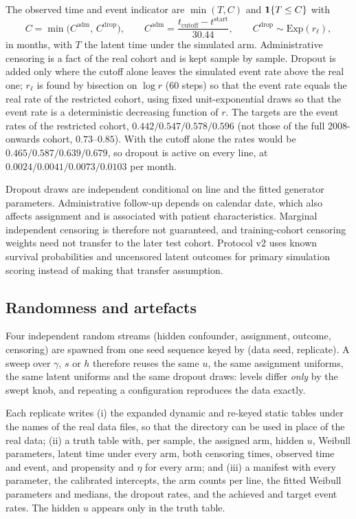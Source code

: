 The observed time and event indicator are $\min(T,C)$ and $\mathbf{1}\{T\le C\}$ with
\begin{equation}
    C=\min\big(C^{\text{adm}},\,C^{\text{drop}}\big),\qquad
    C^{\text{adm}}=\frac{t_{\text{cutoff}}-t^{\text{start}}}{30.44},\qquad
    C^{\text{drop}}\sim\text{Exp}(r_\ell),
\end{equation}
in months, with $T$ the latent time under the simulated arm. Administrative censoring is a
fact of the real cohort and is kept sample by sample. Dropout is added only where the cutoff
alone leaves the simulated event rate above the real one; $r_\ell$ is found by bisection on
$\log r$ (60 steps) so that the event rate equals the real rate of the restricted cohort,
using fixed unit-exponential draws so that the event rate is a deterministic decreasing
function of $r$. The targets are the event rates of the restricted cohort,
$0.442/0.547/0.578/0.596$ (not those of the full 2008-onwards cohort, $0.73$--$0.85$). With
the cutoff alone the rates would be $0.465/0.587/0.639/0.679$, so dropout is active on every
line, at $0.0024/0.0041/0.0073/0.0103$ per month.

Dropout draws are independent conditional on line and the fitted generator parameters.
Administrative follow-up depends on calendar date, which also affects assignment and is
associated with patient characteristics. Marginal independent censoring is therefore not
guaranteed, and training-cohort censoring weights need not transfer to the later test cohort.
Protocol v2 uses known survival probabilities and uncensored latent outcomes for primary
simulation scoring instead of making that transfer assumption.

\subsection{Randomness and artefacts}
\label{app:semisynthetic:seeds}

Four independent random streams (hidden confounder, assignment, outcome, censoring) are
spawned from one seed sequence keyed by (data seed, replicate). A sweep over $\gamma$, $s$ or
$h$ therefore reuses the same $u$, the same assignment uniforms, the same latent uniforms and
the same dropout draws: levels differ \emph{only} by the swept knob, and repeating a
configuration reproduces the data exactly.

Each replicate writes (i) the expanded dynamic and re-keyed static tables under the names of
the real data files, so that the directory can be used in place of the real data; (ii) a truth
table with, per sample, the assigned arm, hidden $u$, Weibull parameters, latent time under
every arm, both censoring times, observed time and event, and propensity and $\eta$ for every
arm; and (iii) a manifest with every parameter, the calibrated intercepts, the arm counts per
line, the fitted Weibull parameters and medians, the dropout rates, and the achieved and
target event rates. The hidden $u$ appears only in the truth table.

